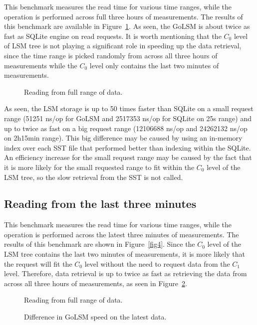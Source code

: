 This benchmark measures the read time for various time ranges, while the operation is performed across full three hours of measurements. The results of this benchmark are available in Figure~\ref{fig3}. As seen, the GoLSM is about twice as fast as SQLite engine on read requests. It is worth mentioning that the $C_0$ level of LSM tree is not playing a significant role in speeding up the data retrieval, since the time range is picked randomly from across all three hours of measurements while the $C_0$ level only contains the last two minutes of measurements.

\begin{figure}[h!]
	\centering
	
	\caption{Reading from full range of data.} \label{fig3}
\end{figure}

As seen, the LSM storage is up to 50 times faster than SQLite on a small request range (51251 ns/op for GoLSM and 2517353 ns/op for SQLite on 25s range) and up to twice as fast on a big request range (12106688 ns/op and 24262132 ns/op on 2h15min range). This big difference may be caused by using an in-memory index over each SST file that performed better than indexing within the SQLite. An efficiency increase for the small request range may be caused by the fact that it is more likely for the small requested range to fit within the $C_0$ level of the LSM tree, so the slow retrieval from the SST is not called.

\subsection{Reading from the last three minutes}

This benchmark measures the read time for various time ranges, while the operation is performed across the latest three minutes of measurements. The results of this benchmark are shown in Figure~\ref{fig4}. Since the $C_0$ level of the LSM tree contains the last two minutes of measurements, it is more likely that the request will fit the $C_0$ level without the need to request data from the $C_1$ level. Therefore, data retrieval is up to twice as fast as retrieving the data from across all three hours of measurements, as seen in Figure~\ref{fig5}. 

\begin{figure}[!htb]
	\begin{minipage}{0.48\textwidth}
		\centering
		\resizebox{\textwidth}{!}{%
			
		}
		\caption{Reading from full range of data.}\label{fig4}
	\end{minipage}\hfill
	\begin{minipage}{0.48\textwidth}
		\centering
		\resizebox{\textwidth}{!}{%
			
		}
		\caption{Difference in GoLSM speed on the latest data.}\label{fig5}
	\end{minipage}
\end{figure}

